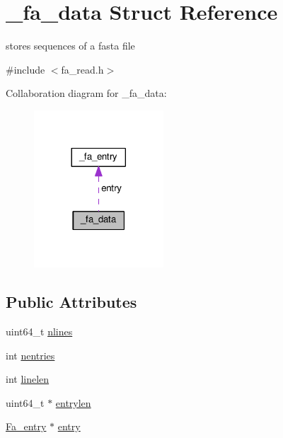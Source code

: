\hypertarget{struct__fa__data}{\section{\+\_\+fa\+\_\+data Struct Reference}
\label{struct__fa__data}
}


stores sequences of a fasta file  




{\ttfamily \#include $<$fa\+\_\+read.\+h$>$}



Collaboration diagram for \+\_\+fa\+\_\+data\+:\nopagebreak
\begin{figure}[H]
\begin{center}
\leavevmode
\includegraphics[width=137pt]{struct__fa__data__coll__graph}
\end{center}
\end{figure}
\subsection*{Public Attributes}
\begin{DoxyCompactItemize}
\item 
uint64\+\_\+t \hyperlink{struct__fa__data_a49ac64b09307f73104bbf1e650f3c2c5}{nlines}
\item 
int \hyperlink{struct__fa__data_a2e49d8da3a888d7df62cd887367e2923}{nentries}
\item 
int \hyperlink{struct__fa__data_a3607f37f43d8b2f14ced6a93c6a444ff}{linelen}
\item 
uint64\+\_\+t $\ast$ \hyperlink{struct__fa__data_acdb54c828a0fbfe8b8851f5290afc16e}{entrylen}
\item 
\hyperlink{fa__read_8h_a8f68b28ad3a6c33fe1dd78d5ac044b30}{Fa\+\_\+entry} $\ast$ \hyperlink{struct__fa__data_a3c2c4488c834a828085df7b409d292e4}{entry}
\end{DoxyCompactItemize}


